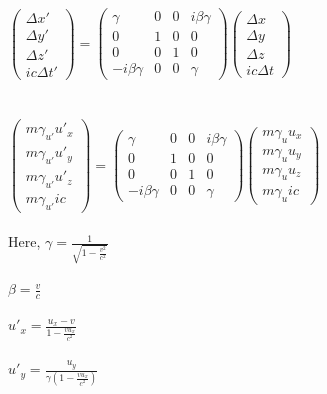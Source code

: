 \documentclass[10pt, a4paper]{article}
\begin{document}
\begin{enumerate}
\begin{enumerate}
$
\begin{pmatrix}
  \Delta x'\\
  \Delta y'\\
  \Delta z'\\
  ic\Delta t'
\end{pmatrix}
=
\begin{pmatrix}
  \gamma & 0 & 0 & i\beta\gamma\\
  0 & 1 & 0 & 0\\
  0 & 0 & 1 & 0\\
  -i\beta\gamma & 0 & 0 & \gamma
\end{pmatrix}
\begin{pmatrix}
  \Delta x\\
  \Delta y\\
  \Delta z\\
  ic\Delta t
\end{pmatrix}
$\\\\\\
$
\begin{pmatrix}
  m\gamma_{u'}u'_{x}\\
  m\gamma_{u'}u'_{y}\\
  m\gamma_{u'}u'_{z}\\
  m\gamma_{u'}ic
\end{pmatrix}
=
\begin{pmatrix}
  \gamma & 0 & 0 & i\beta\gamma\\
  0 & 1 & 0 & 0\\
  0 & 0 & 1 & 0\\
  -i\beta\gamma & 0 & 0 & \gamma
\end{pmatrix}
\begin{pmatrix}
  m\gamma_{u}u_{x}\\
  m\gamma_{u}u_{y}\\
  m\gamma_{u}u_{z}\\
  m\gamma_{u}ic
\end{pmatrix}
$\\\\
Here, $\gamma = \frac{1}{\sqrt{1-\frac{v^{2}}{c^{2}}}}$\\\\
$\beta = \frac{v}{c}$\\\\
$u'_{x} = \frac{u_{x} - v}{1-\frac{v u_{x}}{c^{2}}}$\\\\
$u'_{y} = \frac{u_{y}}{\gamma(1-\frac{v u_{x}}{c^{2}})}$\\\\

\end{enumerate}
\end{enumerate}
\end{document}
